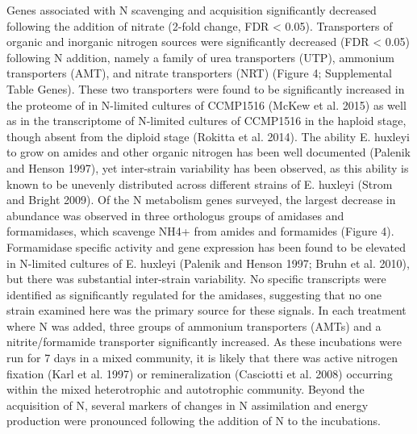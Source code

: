 Genes associated with N scavenging and acquisition significantly decreased following the addition of nitrate (2-fold change, FDR < 0.05). Transporters of organic and inorganic nitrogen sources were significantly decreased (FDR < 0.05) following N addition, namely a family of urea transporters (UTP), ammonium transporters (AMT), and nitrate transporters (NRT) (Figure 4; Supplemental Table Genes). These two transporters were found to be significantly increased in the proteome of in N-limited cultures of CCMP1516 (McKew et al. 2015) as well as in the transcriptome of N-limited cultures of CCMP1516 in the haploid stage, though absent from the diploid stage (Rokitta et al. 2014). The ability E. huxleyi to grow on amides and other organic nitrogen has been well documented (Palenik and Henson 1997), yet inter-strain variability has been observed, as this ability is known to be unevenly distributed across different strains of E. huxleyi (Strom and Bright 2009). Of the N metabolism genes surveyed, the largest decrease in abundance was observed in three orthologus groups of amidases and formamidases, which scavenge NH4+ from amides and formamides (Figure 4). Formamidase specific activity and gene expression has been found to be elevated in N-limited cultures of E. huxleyi (Palenik and Henson 1997; Bruhn et al. 2010), but there was substantial inter-strain variability. No specific transcripts were identified as significantly regulated for the amidases, suggesting that no one strain examined here was the primary source for these signals. In each treatment where N was added, three groups of ammonium transporters (AMTs) and a nitrite/formamide transporter significantly increased. As these incubations were run for 7 days in a mixed community, it is likely that there was active nitrogen fixation (Karl et al. 1997)  or remineralization (Casciotti et al. 2008) occurring within the mixed heterotrophic and autotrophic community. 
Beyond the acquisition of N, several markers of changes in N assimilation and energy production were pronounced following the addition of N to the incubations. 
